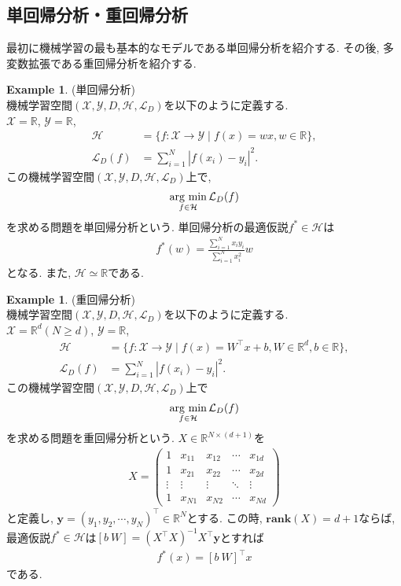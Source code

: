 \documentclass[11pt, a4paper, dvipdfmx]{jsarticle}
\theoremstyle{definition}
\newtheorem{Example+}[Axiom+]{Example}
\newcommand{\R}{\mathbb{R}}
\newcommand{\X}{\mathcal{X}}
\newcommand{\Y}{\mathcal{Y}}
\newcommand{\Hil}{\mathcal{H}}
\newcommand{\Loss}{\mathcal{L}_{D}}
\newcommand{\MLsp}{(\X, \Y, D, \Hil, \Loss)}
\newcommand{\argmin}{\mathop{\rm arg~min}\limits}
\begin{document}
\subsection{単回帰分析・重回帰分析}
最初に機械学習の最も基本的なモデルである単回帰分析を紹介する. その後, 
多変数拡張である重回帰分析を紹介する.
\begin{Example+}(単回帰分析)\\
    機械学習空間$\MLsp$を以下のように定義する.\\
    $\X = \R$, $\Y = \R$, 
    \begin{align*}
        \Hil &= \{f:\X\to\Y\mid f(x) = wx, w\in\R\},\\
        \Loss(f) &= \sum_{i = 1}^{N}|f(x_i) - y_i|^2.
    \end{align*}
    この機械学習空間$\MLsp$上で,
    \begin{align*}
        \argmin_{f\in\Hil}\Loss(f)
    \end{align*}
    を求める問題を単回帰分析という. 単回帰分析の最適仮説$f^{*}\in\Hil$は
    \begin{align*}
        f^{*}(w) = \frac{\sum_{i = 1}^{N}x_{i}y_{i}}{\sum_{i = 1}^{N}x_{i}^2}w
    \end{align*}
    となる. また, $\Hil\simeq\R$である.
\end{Example+}
\begin{Example+}(重回帰分析)\\
    機械学習空間$\MLsp$を以下のように定義する.\\
    $\X = \R^d(N\geq d)$, $\Y = \R$, 
    \begin{align*}
        \Hil &= \{f:\X\to\Y\mid f(x) = W^{\top}x + b, W\in\R^{d}, b\in\R\},\\
        \Loss(f) &= \sum_{i = 1}^{N}|f(x_i) - y_i|^2.
    \end{align*}
    この機械学習空間$\MLsp$上で
    \begin{align*}
        \argmin_{f\in\Hil}\Loss(f)
    \end{align*}
    を求める問題を重回帰分析という. $X\in\R^{N\times(d + 1)}$を
    \begin{align*}
        X = \begin{pmatrix}
            1 & x_{11} & x_{12} & \cdots & x_{1d}\\
            1 & x_{21} & x_{22} & \cdots & x_{2d}\\
            \vdots & \vdots & \vdots & \ddots & \vdots\\
            1 & x_{N1} & x_{N2} & \cdots & x_{Nd}
        \end{pmatrix}
    \end{align*}
    と定義し, $\mathbf{y} = (y_{1}, y_{2}, \cdots, y_{N})^{\top}\in\R^{N}$とする. この時, $\mathbf{rank}(X) = d + 1$ならば, 
    最適仮説$f^*\in\Hil$は$[b~W] = (X^\top X)^{-1}X^\top\mathbf{y}$とすれば
    \begin{align*}
        f^{*}(x) = [b~W]^{\top}x
    \end{align*}
    である.
\end{Example+}
\end{document}
